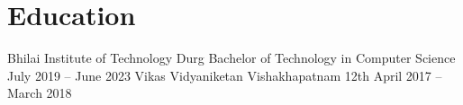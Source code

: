 
\section{Education}
  \resumeSubHeadingListStart
    \resumeSubheading
      {Bhilai Institute of Technology} {Durg}
      {Bachelor of Technology in Computer Science}
      {July 2019 -- June 2023}
    \resumeSubheading
      {Vikas Vidyaniketan} {Vishakhapatnam}
      {12th}
      {April 2017 -- March 2018}
  \resumeSubHeadingListEnd